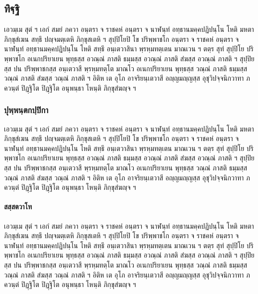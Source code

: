 \documentclass[
]{book}
\begin{document}
\hypertarget{uxe17uxe34uxe10uxe3auxe10uxe34}{%
\subsection{ทิฐฺฐิ}\label{uxe17uxe34uxe10uxe3auxe10uxe34}}

เอวมฺเม สุตํ ฯ เอกํ สมยํ ภควา อนฺตรา จ ราชคหํ อนฺตรา จ นาฬนฺทํ อทฺธานมคฺคปฏิปนฺโน โหติ มหตา ภิกฺขุสํเฆน สทฺธึ ปญฺจมตฺเตหิ ภิกฺขุสเตหิ ฯ สุปฺปิโยปิ โข ปริพฺพาชโก อนฺตรา จ ราชคหํ อนฺตรา จ นาฬนฺทํ อทฺธานมคฺคปฏิปนฺโน โหติ สทฺธึ อนฺเตวาสินา พฺรหฺมทตฺเตน มาณเวน ฯ ตตฺร สุทํ สุปฺปิโย ปริพฺพาชโก อเนกปริยาเยน พุทฺธสฺส อวณฺณํ ภาสติ ธมฺมสฺส อวณฺณํ ภาสติ สํฆสฺส อวณฺณํ ภาสติ ฯ สุปฺปิยสฺส ปน ปริพฺพาชกสฺส อนฺเตวาสี พฺรหฺมทตฺโต มาณโว อเนกปริยาเยน พุทฺธสฺส วณฺณํ ภาสติ ธมฺมสฺส วณฺณํ ภาสติ สํฆสฺส วณฺณํ ภาสติ ฯ อิติห เต อุโภ อาจริยนฺเตวาสี อญฺญมญฺญสฺส อุชุวิปจฺจนิกวาทา ภควนฺตํ ปิฏฺฐิโต ปิฏฺฐิโต อนุพนฺธา โหนฺติ ภิกฺขุสํฆญฺจ ฯ

\hypertarget{uxe1buxe38uxe1euxe3auxe1euxe19uxe3auxe15uxe01uxe1buxe3auxe1buxe34uxe01uxe32}{%
\subsubsection{ปุพฺพนฺตกปฺปิกา}\label{uxe1buxe38uxe1euxe3auxe1euxe19uxe3auxe15uxe01uxe1buxe3auxe1buxe34uxe01uxe32}}

เอวมฺเม สุตํ ฯ เอกํ สมยํ ภควา อนฺตรา จ ราชคหํ อนฺตรา จ นาฬนฺทํ อทฺธานมคฺคปฏิปนฺโน โหติ มหตา ภิกฺขุสํเฆน สทฺธึ ปญฺจมตฺเตหิ ภิกฺขุสเตหิ ฯ สุปฺปิโยปิ โข ปริพฺพาชโก อนฺตรา จ ราชคหํ อนฺตรา จ นาฬนฺทํ อทฺธานมคฺคปฏิปนฺโน โหติ สทฺธึ อนฺเตวาสินา พฺรหฺมทตฺเตน มาณเวน ฯ ตตฺร สุทํ สุปฺปิโย ปริพฺพาชโก อเนกปริยาเยน พุทฺธสฺส อวณฺณํ ภาสติ ธมฺมสฺส อวณฺณํ ภาสติ สํฆสฺส อวณฺณํ ภาสติ ฯ สุปฺปิยสฺส ปน ปริพฺพาชกสฺส อนฺเตวาสี พฺรหฺมทตฺโต มาณโว อเนกปริยาเยน พุทฺธสฺส วณฺณํ ภาสติ ธมฺมสฺส วณฺณํ ภาสติ สํฆสฺส วณฺณํ ภาสติ ฯ อิติห เต อุโภ อาจริยนฺเตวาสี อญฺญมญฺญสฺส อุชุวิปจฺจนิกวาทา ภควนฺตํ ปิฏฺฐิโต ปิฏฺฐิโต อนุพนฺธา โหนฺติ ภิกฺขุสํฆญฺจ ฯ

\hypertarget{uxe2auxe2auxe3auxe2auxe15uxe27uxe32uxe42uxe17}{%
\paragraph{สสฺสตวาโท}\label{uxe2auxe2auxe3auxe2auxe15uxe27uxe32uxe42uxe17}}

เอวมฺเม สุตํ ฯ เอกํ สมยํ ภควา อนฺตรา จ ราชคหํ อนฺตรา จ นาฬนฺทํ อทฺธานมคฺคปฏิปนฺโน โหติ มหตา ภิกฺขุสํเฆน สทฺธึ ปญฺจมตฺเตหิ ภิกฺขุสเตหิ ฯ สุปฺปิโยปิ โข ปริพฺพาชโก อนฺตรา จ ราชคหํ อนฺตรา จ นาฬนฺทํ อทฺธานมคฺคปฏิปนฺโน โหติ สทฺธึ อนฺเตวาสินา พฺรหฺมทตฺเตน มาณเวน ฯ ตตฺร สุทํ สุปฺปิโย ปริพฺพาชโก อเนกปริยาเยน พุทฺธสฺส อวณฺณํ ภาสติ ธมฺมสฺส อวณฺณํ ภาสติ สํฆสฺส อวณฺณํ ภาสติ ฯ สุปฺปิยสฺส ปน ปริพฺพาชกสฺส อนฺเตวาสี พฺรหฺมทตฺโต มาณโว อเนกปริยาเยน พุทฺธสฺส วณฺณํ ภาสติ ธมฺมสฺส วณฺณํ ภาสติ สํฆสฺส วณฺณํ ภาสติ ฯ อิติห เต อุโภ อาจริยนฺเตวาสี อญฺญมญฺญสฺส อุชุวิปจฺจนิกวาทา ภควนฺตํ ปิฏฺฐิโต ปิฏฺฐิโต อนุพนฺธา โหนฺติ ภิกฺขุสํฆญฺจ ฯ
\end{document}

